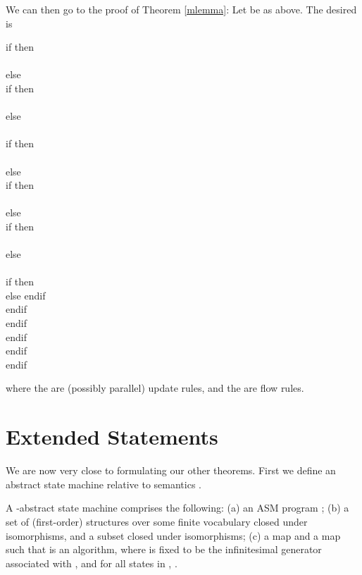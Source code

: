 \documentclass[envcountsame]{llncs}
\newcommand{\itm}[1]{\mbox{\rm(}#1\mbox{\rm)}}
\newcommand\s{\phantom{x}}
\begin{document}
We can then go to the proof of Theorem \ref{mlemma}: 
Let  be as above. The desired  is
\begin{center}
  \begin{minipage}{5cm}
\begin{ttfamily}
\noindent
   if  then\\  \s \\  else \\
   \s if  then\\ \s\s   \\ \s else \\
\s\s\s\s   \\
\s\s\s\s    if  then \\
\s\s\s\s \s  \\
\s\s\s\s  else \\
\s\s\s\s \s\s
   if  then\\
\s\s\s\s \s\s\s  \\
\s\s\s\s  \s\s else \\
\s\s\s\s \s\s\s    if  then \\
\s\s\s\s \s\s\s\s \\
\s\s\s\s \s\s\s  else  \\
\s\s\s\s \s\s\s\s\s\s\s   \\
\s\s\s\s \s\s\s\s \s\s\s   if  then\\
\s\s\s\s \s\s\s\s \s\s\s\s  
\s\s\s\s \s\s\s\s \s\s\s else
\s\s\s\s \s\s\s\s \s\s\s\s  
\s\s\s\s \s\s\s\s \s\s\s endif \\
\s\s\s\s \s\s\s endif \\
\s\s\s\s  \s\s endif\\
\s\s\s\s endif\\
\s endif\\
endif
\end{ttfamily}
\end{minipage}
\end{center}
where the  are (possibly parallel) update  rules, and the  are flow
rules.



\section{Extended Statements}



We are now very close to formulating our other theorems. First we define an
abstract state machine relative to semantics .


\begin{definition} A -abstract state machine  comprises the following:
\itm{a} an ASM program ;
\itm{b} a set  of (first-order) structures over some finite
    vocabulary  closed under isomorphisms, and a subset  closed under isomorphisms;
\itm{c} a map  and a map  such that   is an algorithm, where  is fixed to be the infinitesimal
generator associated with , and
for all
states  in ,
.
\end{definition}
\end{document}

